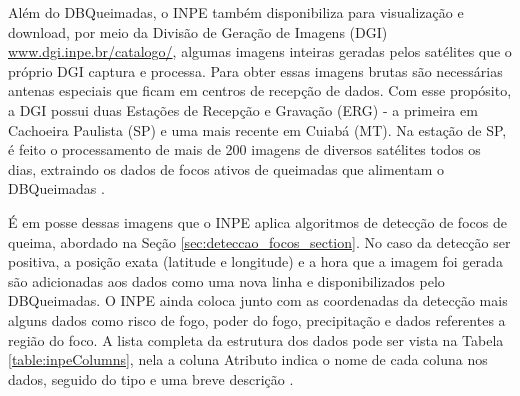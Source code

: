 \documentclass[cic,tc]{iiufrgs}
\begin{document}
Além do DBQueimadas, o INPE também disponibiliza para visualização e download, por meio da Divisão de Geração de Imagens (DGI) \url{www.dgi.inpe.br/catalogo/}, algumas imagens inteiras geradas pelos satélites que o próprio DGI captura e processa. Para obter essas imagens brutas são necessárias antenas especiais que ficam em centros de recepção de dados. Com esse propósito, a DGI possui duas Estações de Recepção e Gravação (ERG) - a primeira em Cachoeira Paulista (SP) e uma mais recente em Cuiabá (MT). Na estação de SP, é feito o processamento de mais de 200 imagens de diversos satélites todos os dias, extraindo os dados de focos ativos de queimadas que alimentam o DBQueimadas \citep{SiteDGI}. \par

É em posse dessas imagens que o INPE aplica algoritmos de detecção de focos de queima, abordado na Seção \ref{sec:deteccao_focos_section}. No caso da detecção ser positiva, a posição exata (latitude e longitude) e a hora que a imagem foi gerada são adicionadas aos dados como uma nova linha e disponibilizados pelo DBQueimadas. O INPE ainda coloca junto com as coordenadas da detecção mais alguns dados como risco de fogo, poder do fogo, precipitação e dados referentes a região do foco. A lista completa da estrutura dos dados pode ser vista na Tabela \ref{table:inpeColumns}, nela a coluna Atributo indica o nome de cada coluna nos dados, seguido do tipo e uma breve descrição \cite{PerguntasFrequentesINPE}. \par
\end{document}
